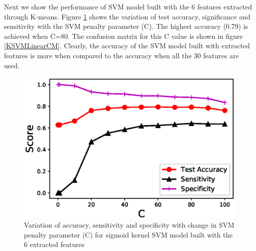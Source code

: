 \documentclass[twoside]{iitbreport}
\begin{document}
Next we show the performance of SVM model built with the 6 features extracted through K-means. Figure \ref{KSVMSigmoid} shows the variation of test accuracy, significance and sensitivity with the SVM penalty parameter (C). The highest accuracy (0.79) is achieved when C=80. The confusion matrix for this C value is shown in figure \ref{KSVMLinearCM}. Clearly, the accuracy of the SVM model built with extracted features is more when compared to the accuracy when all the 30 features are used.   
\begin{figure}[]
  \begin{center}
    \includegraphics[trim={0cm 0cm 0cm 0cm},clip,scale=1]{Figures/KSVM_Sigmoid_Accuracy}
  \end{center}
  \caption{Variation of accuracy, sensitivity and specificity with change in SVM penalty parameter (C) for sigmoid kernel SVM model built with the 6 extracted features}
  \label{KSVMSigmoid}
\end{figure}
\end{document}
